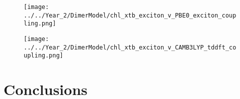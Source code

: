 \begin{figure}
    \centering
    \texttt{[image: ../../Year\_2/DimerModel/chl\_xtb\_exciton\_v\_PBE0\_exciton\_coupling.png]}
    \label{fig:chl_xtb_PBE0_exciton_coupling}
\end{figure}

\begin{figure}
    \centering
    \texttt{[image: ../../Year\_2/DimerModel/chl\_xtb\_exciton\_v\_CAMB3LYP\_tddft\_coupling.png]}
    \label{fig:chl_xtb_camb3lyp_tddft_coupling}
\end{figure}


\afterpartskip
\section{Conclusions}